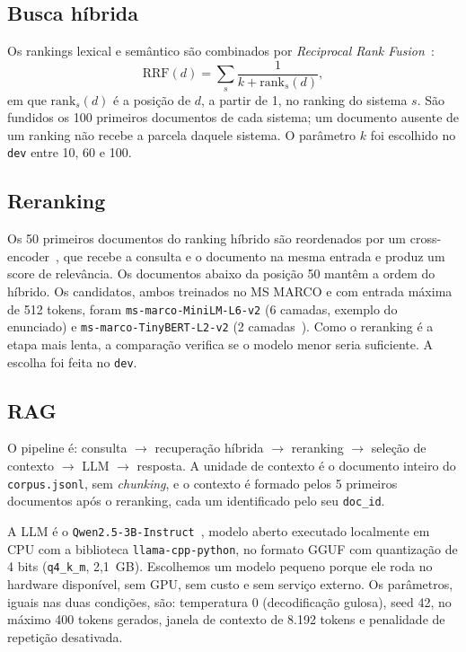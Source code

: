 \documentclass[11pt,a4paper]{article}
\newcommand{\cod}[1]{\texttt{#1}}
\begin{document}
\subsection{Busca híbrida}

Os rankings lexical e semântico são combinados por \emph{Reciprocal Rank Fusion}~\cite{cormack2009}:
\begin{equation*}
\mathrm{RRF}(d)=\sum_{s}\frac{1}{k+\mathrm{rank}_s(d)},
\end{equation*}
em que $\mathrm{rank}_s(d)$ é a posição de $d$, a partir de 1, no ranking do sistema $s$. São fundidos os 100 primeiros documentos de cada sistema; um documento ausente de um ranking não recebe a parcela daquele sistema. O parâmetro $k$ foi escolhido no \cod{dev} entre 10, 60 e 100.

\subsection{Reranking}

Os 50 primeiros documentos do ranking híbrido são reordenados por um cross-encoder~\cite{nogueira2019}, que recebe a consulta e o documento na mesma entrada e produz um score de relevância. Os documentos abaixo da posição 50 mantêm a ordem do híbrido. Os candidatos, ambos treinados no MS MARCO e com entrada máxima de 512 tokens, foram \cod{ms-marco-MiniLM-L6-v2} (6 camadas, exemplo do enunciado) e \cod{ms-marco-TinyBERT-L2-v2} (2 camadas~\cite{jiao2020}). Como o reranking é a etapa mais lenta, a comparação verifica se o modelo menor seria suficiente. A escolha foi feita no \cod{dev}.

\subsection{RAG}

O pipeline é: consulta $\rightarrow$ recuperação híbrida $\rightarrow$ reranking $\rightarrow$ seleção de contexto $\rightarrow$ LLM $\rightarrow$ resposta. A unidade de contexto é o documento inteiro do \cod{corpus.jsonl}, sem \emph{chunking}, e o contexto é formado pelos 5 primeiros documentos após o reranking, cada um identificado pelo seu \cod{doc\_id}.

A LLM é o \cod{Qwen2.5-3B-Instruct}~\cite{qwen2024}, modelo aberto executado localmente em CPU com a biblioteca \cod{llama-cpp-python}, no formato GGUF com quantização de 4 bits (\cod{q4\_k\_m}, 2,1~GB). Escolhemos um modelo pequeno porque ele roda no hardware disponível, sem GPU, sem custo e sem serviço externo. Os parâmetros, iguais nas duas condições, são: temperatura 0 (decodificação gulosa), seed 42, no máximo 400 tokens gerados, janela de contexto de 8.192 tokens e penalidade de repetição desativada.
\end{document}

